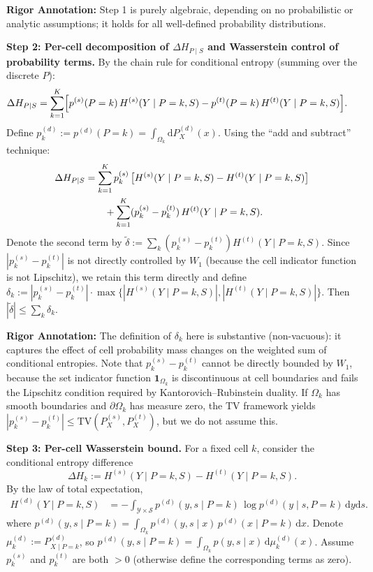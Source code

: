 \documentclass[12pt,a4paper]{article}
\newcommand{\cY}{\mathcal{Y}}
\newcommand{\cS}{\mathcal{S}}
\newcommand{\TV}{\mathrm{TV}}
\newcommand{\annotation}{\medskip\noindent\textbf{Rigor Annotation: }}
\begin{document}
\annotation Step 1 is purely algebraic, depending on no probabilistic or analytic assumptions; it holds for all well-defined probability distributions.

\medskip\noindent
\textbf{Step 2: Per-cell decomposition of $\Delta H_{P\mid S}$ and Wasserstein control of probability terms.}
By the chain rule for conditional entropy (summing over the discrete $P$):
\begin{align}
    \Delta H_{P\mid S}
    &= \sum_{k=1}^{K} \Bigl[
        p^{(s)}(P=k)\,H^{(s)}(Y\mid P=k,S)
        - p^{(t)}(P=k)\,H^{(t)}(Y\mid P=k,S)
    \Bigr]. \label{eq:step2a}
\end{align}
Define $p^{(d)}_k := p^{(d)}(P=k)=\int_{\Omega_k}\mathrm{d}P^{(d)}_X(x)$.
Using the ``add and subtract'' technique:
\begin{align}
    \Delta H_{P\mid S}
    &= \sum_{k=1}^{K} p^{(s)}_k\,
       \bigl[H^{(s)}(Y\mid P=k,S)-H^{(t)}(Y\mid P=k,S)\bigr] \notag\\
    &\qquad + \sum_{k=1}^{K} (p^{(s)}_k-p^{(t)}_k)\,
       H^{(t)}(Y\mid P=k,S). \label{eq:step2b}
\end{align}
Denote the second term by $\widetilde{\delta} := \sum_k (p^{(s)}_k-p^{(t)}_k)
H^{(t)}(Y\mid P=k,S)$. Since $|p^{(s)}_k-p^{(t)}_k|$ is not directly controlled by $W_1$ (because the cell indicator function is not Lipschitz), we retain this term directly and define $\delta_k := |p^{(s)}_k-p^{(t)}_k|\cdot
\max\{|H^{(s)}(Y\mid P=k,S)|,|H^{(t)}(Y\mid P=k,S)|\}$.
Then $|\widetilde{\delta}| \leq \sum_k \delta_k$.
\checkmark

\annotation The definition of $\delta_k$ here is substantive (non-vacuous):
it captures the effect of cell probability mass changes on the weighted sum of conditional entropies. Note that $p^{(s)}_k-p^{(t)}_k$ cannot be directly bounded by $W_1$, because the set indicator function $\mathbf{1}_{\Omega_k}$ is discontinuous at cell boundaries and fails the Lipschitz condition required by Kantorovich--Rubinstein duality. If $\Omega_k$ has smooth boundaries and $\partial\Omega_k$ has measure zero, the TV framework yields $|p^{(s)}_k-p^{(t)}_k|\leq \TV(P^{(s)}_X,P^{(t)}_X)$, but we do not assume this.

\medskip\noindent
\textbf{Step 3: Per-cell Wasserstein bound.}
For a fixed cell $k$, consider the conditional entropy difference
\begin{equation}\label{eq:step3a}
    \Delta H_k := H^{(s)}(Y\mid P=k,S) - H^{(t)}(Y\mid P=k,S).
\end{equation}
By the law of total expectation,
\begin{align*}
    H^{(d)}(Y\mid P=k,S)
    &= -\int_{\cY\times\cS} p^{(d)}(y,s\mid P=k)\,
       \log p^{(d)}(y\mid s,P=k)\,\mathrm{d}y\mathrm{d}s.
\end{align*}
where $p^{(d)}(y,s\mid P=k) = \int_{\Omega_k} p^{(d)}(y,s\mid x)\,
p^{(d)}(x\mid P=k)\,\mathrm{d}x$. Denote
$\mu^{(d)}_k := P^{(d)}_{X\mid P=k}$, so
$p^{(d)}(y,s\mid P=k) = \int_{\Omega_k} p(y,s\mid x)\,\mathrm{d}\mu^{(d)}_k(x)$.
Assume $p^{(s)}_k$ and $p^{(t)}_k$ are both $>0$ (otherwise define the corresponding terms as zero).
\end{document}
